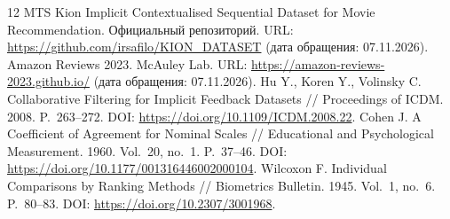 \documentclass{misisarticle}
\begin{document}
\begin{thebibliography}{12}
 MTS Kion Implicit Contextualised Sequential Dataset for Movie Recommendation. Официальный репозиторий. URL: \url{https://github.com/irsafilo/KION_DATASET} (дата обращения: 07.11.2026).
 Amazon Reviews 2023. McAuley Lab. URL: \url{https://amazon-reviews-2023.github.io/} (дата обращения: 07.11.2026).
 Hu Y., Koren Y., Volinsky C. Collaborative Filtering for Implicit Feedback Datasets // Proceedings of ICDM. 2008. P.~263--272. DOI: \url{https://doi.org/10.1109/ICDM.2008.22}.
 Cohen J. A Coefficient of Agreement for Nominal Scales // Educational and Psychological Measurement. 1960. Vol.~20, no.~1. P.~37--46. DOI: \url{https://doi.org/10.1177/001316446002000104}.
 Wilcoxon F. Individual Comparisons by Ranking Methods // Biometrics Bulletin. 1945. Vol.~1, no.~6. P.~80--83. DOI: \url{https://doi.org/10.2307/3001968}.
\end{thebibliography}
\end{document}
